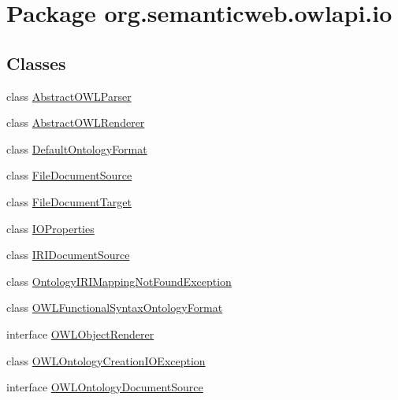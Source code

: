 \hypertarget{namespaceorg_1_1semanticweb_1_1owlapi_1_1io}{\section{Package org.\-semanticweb.\-owlapi.\-io}
\label{namespaceorg_1_1semanticweb_1_1owlapi_1_1io}
}
\subsection*{Classes}
\begin{DoxyCompactItemize}
\item 
class \hyperlink{classorg_1_1semanticweb_1_1owlapi_1_1io_1_1_abstract_o_w_l_parser}{Abstract\-O\-W\-L\-Parser}
\item 
class \hyperlink{classorg_1_1semanticweb_1_1owlapi_1_1io_1_1_abstract_o_w_l_renderer}{Abstract\-O\-W\-L\-Renderer}
\item 
class \hyperlink{classorg_1_1semanticweb_1_1owlapi_1_1io_1_1_default_ontology_format}{Default\-Ontology\-Format}
\item 
class \hyperlink{classorg_1_1semanticweb_1_1owlapi_1_1io_1_1_file_document_source}{File\-Document\-Source}
\item 
class \hyperlink{classorg_1_1semanticweb_1_1owlapi_1_1io_1_1_file_document_target}{File\-Document\-Target}
\item 
class \hyperlink{classorg_1_1semanticweb_1_1owlapi_1_1io_1_1_i_o_properties}{I\-O\-Properties}
\item 
class \hyperlink{classorg_1_1semanticweb_1_1owlapi_1_1io_1_1_i_r_i_document_source}{I\-R\-I\-Document\-Source}
\item 
class \hyperlink{classorg_1_1semanticweb_1_1owlapi_1_1io_1_1_ontology_i_r_i_mapping_not_found_exception}{Ontology\-I\-R\-I\-Mapping\-Not\-Found\-Exception}
\item 
class \hyperlink{classorg_1_1semanticweb_1_1owlapi_1_1io_1_1_o_w_l_functional_syntax_ontology_format}{O\-W\-L\-Functional\-Syntax\-Ontology\-Format}
\item 
interface \hyperlink{interfaceorg_1_1semanticweb_1_1owlapi_1_1io_1_1_o_w_l_object_renderer}{O\-W\-L\-Object\-Renderer}
\item 
class \hyperlink{classorg_1_1semanticweb_1_1owlapi_1_1io_1_1_o_w_l_ontology_creation_i_o_exception}{O\-W\-L\-Ontology\-Creation\-I\-O\-Exception}
\item 
interface \hyperlink{interfaceorg_1_1semanticweb_1_1owlapi_1_1io_1_1_o_w_l_ontology_document_source}{O\-W\-L\-Ontology\-Document\-Source}

\end{DoxyCompactItemize}
